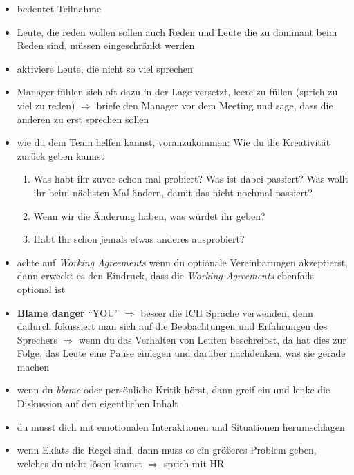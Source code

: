 
\begin{itemize}
  \item bedeutet Teilnahme
  \item Leute, die reden wollen sollen auch Reden und Leute die zu dominant beim Reden sind,
    müssen eingeschränkt werden
  \item aktiviere Leute, die nicht so viel sprechen
  \item Manager fühlen sich oft dazu in der Lage versetzt, leere zu füllen (sprich zu viel zu
    reden) $\Rightarrow$  briefe den Manager vor dem Meeting und sage, dass die anderen zu erst
  sprechen sollen
  \item wie du dem Team helfen kannst, voranzukommen: Wie du die Kreativität zurück geben kannst
    \begin{enumerate}
      \item Was habt ihr zuvor schon mal probiert? Was ist dabei passiert? Was wollt ihr beim
        nächsten Mal ändern, damit das nicht nochmal passiert?
      \item Wenn wir die Änderung haben, was würdet ihr geben?
      \item Habt Ihr schon jemals etwas anderes ausprobiert?
    \end{enumerate}
  \item achte auf \textit{Working Agreements} wenn du optionale Vereinbarungen akzeptierst, dann
    erweckt es den Eindruck, dass die \textit{Working Agreements} ebenfalls optional ist
  \item \textbf{Blame danger} \enquote{YOU} $\Rightarrow$  besser die ICH Sprache verwenden, denn dadurch
  fokussiert man sich auf die Beobachtungen und Erfahrungen des Sprechers $\Rightarrow$  wenn du das
  Verhalten von Leuten beschreibst, da  hat dies zur Folge, das Leute eine Pause einlegen und
  darüber nachdenken, was sie gerade machen
  \item wenn du \textit{blame} oder persönliche Kritik hörst, dann greif ein und lenke die
    Diskussion auf den eigentlichen Inhalt
  \item du musst dich mit emotionalen Interaktionen und Situationen herumschlagen
  \item wenn Eklats die Regel sind, dann muss es ein größeres Problem geben, welches
    du nicht lösen kannst $\Rightarrow$  sprich mit HR
\end{itemize}





